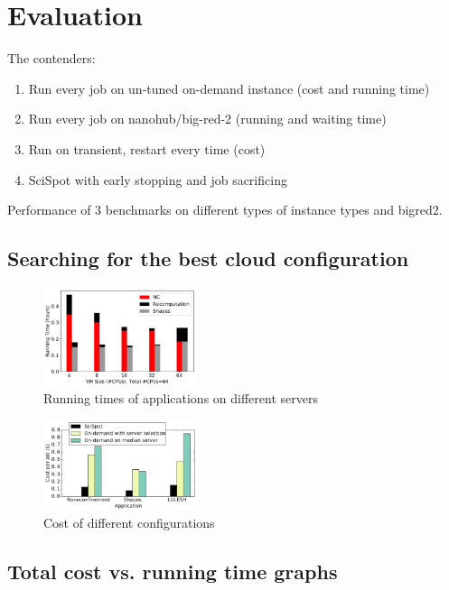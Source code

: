 \section{Evaluation}

The contenders:
\begin{enumerate}
\item Run every job on un-tuned on-demand instance (cost and running time)
\item Run every job on nanohub/big-red-2 (running and waiting time)
\item Run on transient, restart every time (cost)
\item SciSpot with early stopping and job sacrificing 
\end{enumerate}

Performance of 3 benchmarks on different types of instance types and bigred2.



\subsection{Searching for the best cloud configuration}

\begin{figure}
  \centering
  \includegraphics[width=0.4\textwidth]{../graphs/cost-bars.pdf}
  \caption{Running times of applications on different servers}
  \label{fig:cost-bar}
\end{figure}


\begin{figure}
  \centering
  \includegraphics[width=0.4\textwidth]{../graphs/cost-only-bar.pdf}
  \caption{Cost of different configurations}
  \label{fig:cost-only-bar}
\end{figure}



\subsection{Total cost vs. running time graphs}

